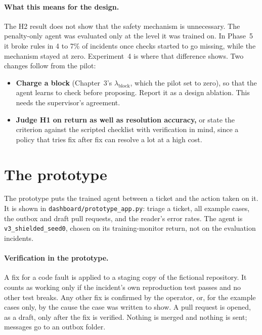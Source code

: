 \documentclass[11pt,a4paper]{article}
\newcommand{\file}[1]{\texttt{\small #1}}
\begin{document}
\paragraph{What this means for the design.} The H2 result does not show that the safety mechanism is unnecessary. The penalty-only agent was evaluated only at the level it was trained on. In Phase~5 it broke rules in 4 to 7\% of incidents once checks started to go missing, while the mechanism stayed at zero. Experiment~4 is where that difference shows. Two changes follow from the pilot:
\begin{itemize}
  \item \textbf{Charge a block} (Chapter~3's $\lambda_{\text{block}}$, which the pilot set to zero), so that the agent learns to check before proposing. Report it as a design ablation. This needs the supervisor's agreement.
  \item \textbf{Judge H1 on return as well as resolution accuracy,} or state the criterion against the scripted checklist with verification in mind, since a policy that tries fix after fix can resolve a lot at a high cost.
\end{itemize}

\section{The prototype}\label{sec:prototype}

The prototype puts the trained agent between a ticket and the action taken on it. It is shown in \file{dashboard/prototype\_app.py}: triage a ticket, all example cases, the outbox and draft pull requests, and the reader's error rates. The agent is \file{v3\_shielded\_seed0}, chosen on its training-monitor return, not on the evaluation incidents.

\paragraph{Verification in the prototype.} A fix for a code fault is applied to a staging copy of the fictional repository. It counts as working only if the incident's own reproduction test passes and no other test breaks. Any other fix is confirmed by the operator, or, for the example cases only, by the cause the case was written to show. A pull request is opened, as a draft, only after the fix is verified. Nothing is merged and nothing is sent; messages go to an outbox folder.
\end{document}
